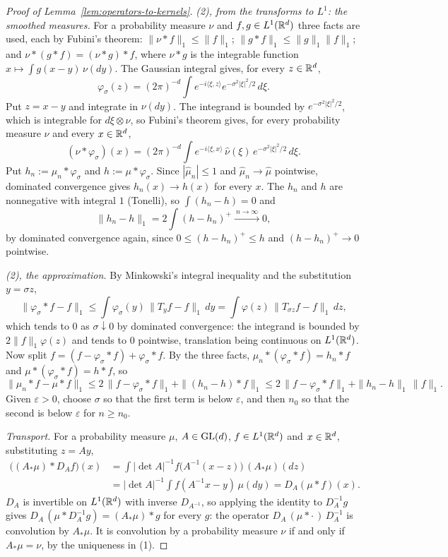 \begin{proof}[Proof of Lemma~\ref{lem:operators-to-kernels}]
\emph{(2), from the transforms to $L^1$: the smoothed measures.} For a probability measure $\nu$
and $f, g \in L^1(\mathbb{R}^d)$ three facts are used, each by Fubini's theorem:
$\|\nu * f\|_1 \le \|f\|_1$; $\|g * f\|_1 \le \|g\|_1\|f\|_1$; and
$\nu * (g * f) = (\nu * g) * f$, where $\nu * g$ is the integrable function
$x \mapsto \int g(x - y)\,\nu(dy)$. The Gaussian integral gives, for every $z \in \mathbb{R}^d$,
\[
  \varphi_\sigma(z) = (2\pi)^{-d}\int e^{-i\langle\xi,z\rangle}e^{-\sigma^2|\xi|^2/2}\,d\xi .
\]
Put $z = x - y$ and integrate in $\nu(dy)$. The integrand is bounded by $e^{-\sigma^2|\xi|^2/2}$,
which is integrable for $d\xi \otimes \nu$, so Fubini's theorem gives, for every probability
measure $\nu$ and every $x \in \mathbb{R}^d$,
\[
  (\nu * \varphi_\sigma)(x) = (2\pi)^{-d}\int e^{-i\langle\xi,x\rangle}\,\widehat\nu(\xi)\,
  e^{-\sigma^2|\xi|^2/2}\,d\xi .
\]
Put $h_n := \mu_n * \varphi_\sigma$ and $h := \mu * \varphi_\sigma$. Since $|\widehat\mu_n| \le 1$ and
$\widehat\mu_n \to \widehat\mu$ pointwise, dominated convergence gives $h_n(x) \to h(x)$ for every
$x$. The $h_n$ and $h$ are nonnegative with integral $1$ (Tonelli), so $\int(h_n - h) = 0$ and
\[
  \|h_n - h\|_1 = 2\int(h - h_n)^+ \xrightarrow{\ n \to \infty\ } 0 ,
\]
by dominated convergence again, since $0 \le (h - h_n)^+ \le h$ and $(h - h_n)^+ \to 0$ pointwise.

\emph{(2), the approximation.} By Minkowski's integral inequality and the substitution $y = \sigma z$,
\[
  \|\varphi_\sigma * f - f\|_1 \le \int\varphi_\sigma(y)\,\|T_yf - f\|_1\,dy
  = \int\varphi(z)\,\|T_{\sigma z}f - f\|_1\,dz ,
\]
which tends to $0$ as $\sigma \downarrow 0$ by dominated convergence: the integrand is bounded by
$2\|f\|_1\varphi(z)$ and tends to $0$ pointwise, translation being continuous on $L^1(\mathbb{R}^d)$. Now
split $f = (f - \varphi_\sigma * f) + \varphi_\sigma * f$. By the three facts,
$\mu_n * (\varphi_\sigma * f) = h_n * f$ and $\mu * (\varphi_\sigma * f) = h * f$, so
\[
  \|\mu_n * f - \mu * f\|_1 \le 2\,\|f - \varphi_\sigma * f\|_1 + \|(h_n - h) * f\|_1
  \le 2\,\|f - \varphi_\sigma * f\|_1 + \|h_n - h\|_1\,\|f\|_1 .
\]
Given $\varepsilon > 0$, choose $\sigma$ so that the first term is below $\varepsilon$, and then $n_0$ so
that the second is below $\varepsilon$ for $n \ge n_0$.

\emph{Transport.} For a probability measure $\mu$, $A \in \mathrm{GL}(d)$, $f \in L^1(\mathbb{R}^d)$ and
$x \in \mathbb{R}^d$, substituting $z = Ay$,
\[
\begin{aligned}
  \bigl((A_*\mu) * D_Af\bigr)(x) &= \int |\det A|^{-1}f\bigl(A^{-1}(x - z)\bigr)\,(A_*\mu)(dz) \\
  &= |\det A|^{-1}\int f(A^{-1}x - y)\,\mu(dy) = D_A(\mu * f)(x) .
\end{aligned}
\]
$D_A$ is invertible on $L^1(\mathbb{R}^d)$ with inverse $D_{A^{-1}}$, so applying the identity to
$D_A^{-1}g$ gives $D_A\,(\mu * D_A^{-1}g) = (A_*\mu) * g$ for every $g$: the operator
$D_A\,(\mu * \cdot\,)\,D_A^{-1}$ is convolution by $A_*\mu$. It is convolution by a probability
measure $\nu$ if and only if $A_*\mu = \nu$, by the uniqueness in (1).


\end{proof}
